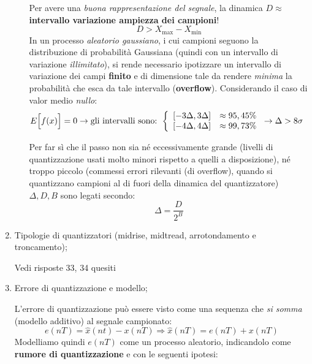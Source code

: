 \documentclass[
]{article}
\begin{document}
\begin{enumerate}
\begin{itemize}
    Per avere una \emph{buona rappresentazione del segnale}, la dinamica
    \(D \approx\) \textbf{intervallo variazione ampiezza dei campioni}!
    \[
      D > X_{\text{max}}-X_{\text{min}}
      \] In un processo \emph{aleatorio gaussiano}, i cui campioni
    seguono la distribuzione di probabilità Gaussiana (quindi con un
    intervallo di variazione \emph{illimitato}), si rende necessario
    ipotizzare un intervallo di variazione dei campi \textbf{finito} e
    di dimensione tale da rendere \emph{minima} la probabilità che esca
    da tale intervallo (\textbf{overflow}). Considerando il caso di
    valor medio \emph{nullo}: \begin{align*}
      E\Big[f(x)\Big]=0 &\to \text{gli intervalli sono: }
      \left\{\begin{array}{cl}
      [-3\Delta, 3\Delta] & \approx 95,45 \% \\ \relax 
      [-4\Delta, 4\Delta] & \approx 99,73 \%
      \end{array} \right. \to \Delta > 8\sigma
      \end{align*}

    Per far sì che il passo non sia né eccessivamente grande (livelli di
    quantizzazione usati molto minori rispetto a quelli a disposizione),
    né troppo piccolo (commessi errori rilevanti (di overflow), quando
    si quantizzano campioni al di fuori della dinamica del
    quantizzatore) \(\Delta, D, B\) sono legati secondo: \[
      \Delta=\frac{D}{2^B}
      \]
  \end{itemize}
\item
  Tipologie di quantizzatori (midrise, midtread, arrotondamento e
  troncamento);

  Vedi risposte 33, 34 quesiti
\item
  Errore di quantizzazione e modello;

  L'errore di quantizzazione può essere visto come una sequenza che
  \emph{si somma} (modello additivo) al segnale campionato: \[
  e(nT)=\hat{x}(nt)-x(nT) \Rightarrow \hat{x}(nT) = e(nT)+x(nT)
  \] Modelliamo quindi \(e(nT)\) come un processo aleatorio, indicandolo
  come \textbf{rumore di quantizzazione} e con le seguenti ipotesi:


\end{enumerate}
\end{document}
